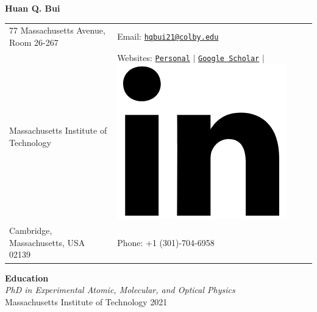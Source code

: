 \documentclass[10pt]{article}
\begin{document}
\noindent  
\begin{center}
{\Huge{\textbf{Huan Q. Bui}}}
\end{center}
\vspace{-10pt}
\hrulefill
\vspace{-1ex}

\normalsize







\begin{center}
\begin{tabular}{l l}
     77 Massachusetts Avenue, Room 26-267		 & \hspace{1in} Email: \href{mailto:hqbui21@colby.edu}{\texttt{hqbui21@colby.edu}} \\
     Massachusetts Institute of Technology				 & \hspace{1in}  Websites: \href{www.huanqbui.com}{\texttt{Personal}} 
     $\vert$ 	\href{https://scholar.google.com/citations?user=ejxM5pkAAAAJ\&hl=en}{\texttt{Google Scholar}} 
     $\vert$ 					\href{https://www.linkedin.com/in/huan-bui/}{\includegraphics[scale=0.04]{linkedin_logo.PNG}} \\
 	Cambridge, Massachusetts, USA 02139 & \hspace{1in} Phone: +1 (301)-704-6958\\
\end{tabular}
\end{center}



\noindent\large{\textbf{{Education}}} \normalsize\\
\noindent \textit{PhD in Experimental Atomic, Molecular, and Optical Physics} \\
Massachusetts Institute of Technology \hfill {2021\textendash}\\
\end{document}
